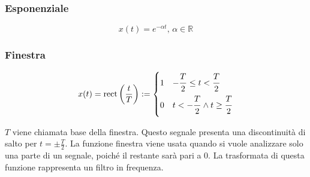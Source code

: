 \documentclass{article}
\newcommand{\rect}{\mathrm{rect}}
\numberwithin{equation}{subsection}
\begin{document}
\subsubsection{Esponenziale}

\begin{equation}
    x(t)=e^{-\alpha t},\,\alpha\in\mathbb{R}
\end{equation}

\begin{figure}[H]%
    \centering
    \qquad
\end{figure}

\subsubsection{Finestra}

\begin{equation}
    x(t)=\rect\left(\displaystyle\frac{t}{T}\right):=\begin{cases}
        1 & \displaystyle-\frac{\strut T}{\strut 2}\leq t <\frac{\strut T}{\strut 2}\\
        0 & \displaystyle t<-\frac{\strut T}{\strut 2} \land t\geq\frac{\strut T}{\strut 2}
    \end{cases}
\end{equation}

$T$ viene chiamata base della finestra. Questo segnale presenta una discontinuità di salto per $t=\pm\displaystyle\frac{T}{2}$. La funzione finestra viene usata quando si 
vuole analizzare solo una parte di un segnale, poiché il restante sarà pari a $0$. La trasformata di questa funzione rappresenta un filtro in frequenza. 
\end{document}
